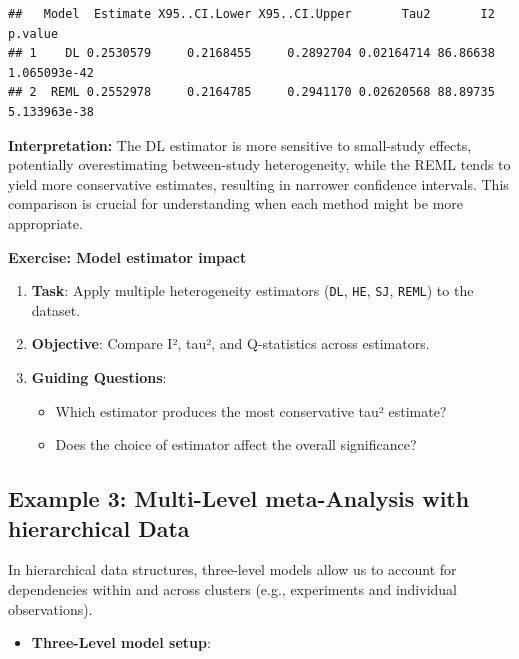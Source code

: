 \documentclass[
]{book}
\providecommand{\tightlist}{%
  \setlength{\itemsep}{0pt}\setlength{\parskip}{0pt}}
\begin{document}
\begin{verbatim}
##   Model  Estimate X95..CI.Lower X95..CI.Upper       Tau2       I2      p.value
## 1    DL 0.2530579     0.2168455     0.2892704 0.02164714 86.86638 1.065093e-42
## 2  REML 0.2552978     0.2164785     0.2941170 0.02620568 88.89735 5.133963e-38
\end{verbatim}

\textbf{Interpretation:} The DL estimator is more sensitive to small-study effects, potentially overestimating between-study heterogeneity, while the REML tends to yield more conservative estimates, resulting in narrower confidence intervals. This comparison is crucial for understanding when each method might be more appropriate.

\textbf{Exercise: Model estimator impact}

\begin{enumerate}
\def\labelenumi{\arabic{enumi}.}
\item
  \textbf{Task}: Apply multiple heterogeneity estimators (\texttt{DL}, \texttt{HE}, \texttt{SJ}, \texttt{REML}) to the dataset.
\item
  \textbf{Objective}: Compare I², tau², and Q-statistics across estimators.
\item
  \textbf{Guiding Questions}:

  \begin{itemize}
  \item
    Which estimator produces the most conservative tau² estimate?
  \item
    Does the choice of estimator affect the overall significance?
  \end{itemize}
\end{enumerate}

\subsection{Example 3: Multi-Level meta-Analysis with hierarchical Data}\label{example-3-multi-level-meta-analysis-with-hierarchical-data}

In hierarchical data structures, three-level models allow us to account for dependencies within and across clusters (e.g., experiments and individual observations).

\begin{itemize}
\tightlist
\item
  \textbf{Three-Level model setup}:
\end{itemize}
\end{document}
